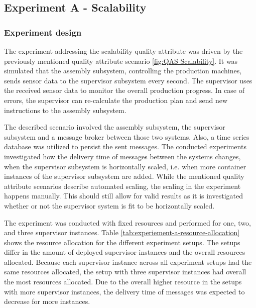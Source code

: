 \documentclass[conference]{IEEEtran}
\begin{document}
\subsection{Experiment A - Scalability}
 
\subsubsection{Experiment design}
\label{sec:design}

The experiment addressing the scalability quality attribute was driven by the previously mentioned quality attribute scenario \ref{fig:QAS Scalability}. It was simulated that the assembly subsystem, controlling the production machines, sends sensor data to the supervisor subsystem every second. The supervisor uses the received sensor data to monitor the overall production progress. In case of errors, the supervisor can re-calculate the production plan and send new instructions to the assembly subsystem.

The described scenario involved the assembly subsystem, the supervisor subsystem and a message broker between those two systems. Also, a time series database was utilized to persist the sent messages. The conducted experiments investigated how the delivery time of messages between the systems changes, when the supervisor subsystem is horizontally scaled, i.e. when more container instances of the supervisor subsystem are added. While the mentioned quality attribute scenarios describe automated scaling, the scaling in the experiment happens manually. This should still allow for valid results as it is investigated whether or not the supervisor system is fit to be horizontally scaled.

The experiment was conducted with fixed resources and performed for one, two, and three supervisor instances. Table \ref{tab:experiement-a-resource-allocation} shows the resource allocation for the different experiment setups. The setups differ in the amount of deployed supervisor instances and the overall resources allocated. Because each supervisor instance across all experiment setups had the same resources allocated, the setup with three supervisor instances had overall the most resources allocated. Due to the overall higher resource in the setups with more supervisor instances, the delivery time of messages was expected to decrease for more instances.
\end{document}

